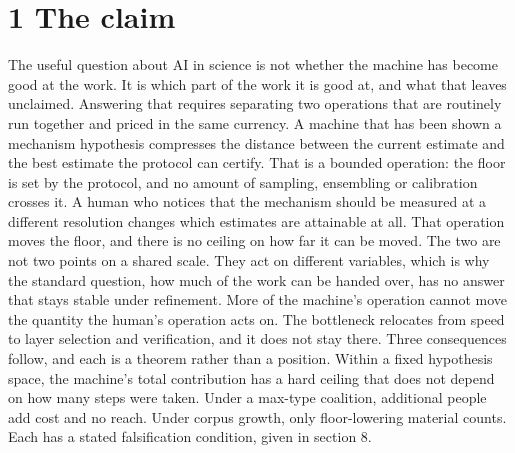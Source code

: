 \documentclass[11pt,a4paper]{article}
\theoremstyle{definition}
\theoremstyle{remark}
\begin{document}
\section*{1  The claim}
The useful question about AI in science is not whether the machine has become good at the work. It is which part of the work it is good at, and what that leaves unclaimed. Answering that requires separating two operations that are routinely run together and priced in the same currency.
A machine that has been shown a mechanism hypothesis compresses the distance between the current estimate and the best estimate the protocol can certify. That is a bounded operation: the floor is set by the protocol, and no amount of sampling, ensembling or calibration crosses it. A human who notices that the mechanism should be measured at a different resolution changes which estimates are attainable at all. That operation moves the floor, and there is no ceiling on how far it can be moved.
The two are not two points on a shared scale. They act on different variables, which is why the standard question, how much of the work can be handed over, has no answer that stays stable under refinement. More of the machine's operation cannot move the quantity the human's operation acts on. The bottleneck relocates from speed to layer selection and verification, and it does not stay there.
Three consequences follow, and each is a theorem rather than a position. Within a fixed hypothesis space, the machine's total contribution has a hard ceiling that does not depend on how many steps were taken. Under a max-type coalition, additional people add cost and no reach. Under corpus growth, only floor-lowering material counts. Each has a stated falsification condition, given in section 8.
\end{document}
